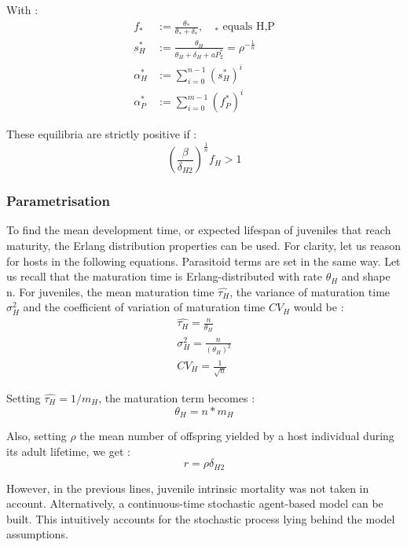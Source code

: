 \documentclass[12pt,a4paper,onecolumn]{article}
\begin{document}
With :
\begin{align}
f_* &:= \frac{\theta_*}{\theta_* + \delta_*}, \quad \text{$_*$ equals H,P} \nonumber  \\
s_H^* &:= \frac{\theta_H}{\theta_H + \delta_H + aP_2^*} = \rho^{-\frac{1}{n}} \nonumber \\
\alpha_H^* &:= \sum_{i=0}^{n-1} (s_H^*)^i   \\
\alpha_P^* &:= \sum_{i=0}^{m-1} (f_P^*)^i \nonumber
\end{align}

These equilibria are strictly positive if :
\begin{equation}
(\frac{\beta}{\delta_{H2}})^{\frac{1}{n}} f_H  > 1
\end{equation}

\subsubsection{Parametrisation}
To find the mean development time, or expected lifespan of juveniles that reach maturity, the Erlang distribution properties can be used.
For clarity, let us reason for hosts in the following equations. Parasitoid terms are set in the same way.  Let us recall that the maturation time is Erlang-distributed with rate $\theta_H$ and shape n. For juveniles, the mean maturation time $\hat{\tau_{H}}$, the variance of maturation time $\sigma^2_{H}$ and the coefficient of variation of maturation time $CV_{H}$ would be : 
\begin{align}
\hat{\tau_{H}} = \frac{n}{\theta_{H}} \nonumber \\
\sigma^2_{H} = \frac{n}{(\theta_{H})^2} \\
CV_{H} = \frac{1}{\sqrt{n}} \nonumber 
\end{align}

Setting  $\hat{\tau_{H}} = 1/m_H$, the maturation term becomes :
\begin{equation}
\theta_H = n*m_H
\end{equation}

Also, setting $\rho$ the mean number of offspring yielded by a host individual during its adult lifetime, we get :
\begin{equation}
r = \rho \delta_{H2}
\end{equation}

However, in the previous lines, juvenile intrinsic mortality was not taken in account. Alternatively, a continuous-time stochastic agent-based model can be built. This intuitively accounts for the stochastic process lying behind the model assumptions.
\end{document}
